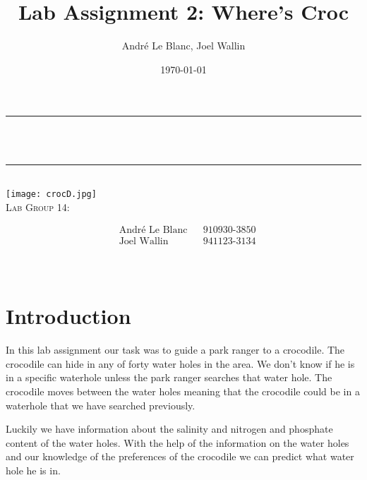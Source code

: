\documentclass[12pt, a4paper]{article}
\title{Lab Assignment 2: Where’s Croc}	%
\author{André Le Blanc, Joel Wallin}
\date{\today}
\makeatletter
\let\thetitle\@title
\makeatother
\begin{document}
\begin{titlepage}
	\centering
    \vspace*{0.5 cm}
	\rule{\linewidth}{0.2 mm} \\[0.4 cm]
	{ \huge \bfseries \thetitle}\\  
	\rule{\linewidth}{0.2 mm} \\[1.5 cm]
    \texttt{[image: crocD.jpg]}\\[0.5 cm]
    
    \textsc{\Large Lab Group 14:}\\[0.5 cm]
	\begin{minipage}{0.4\textwidth}  
    \begin{align*}
	&\text{André Le Blanc}    &&\text{910930-3850}\\
	&\text{Joel Wallin}  &&\text{941123-3134}\\
	\end{align*}
	\end{minipage}\\[2 cm]
\end{titlepage}


\newpage
\tableofcontents
\newpage

\section{Introduction}

In this lab assignment our task was to guide a park ranger to a crocodile. The crocodile can hide in any of forty water holes in the area. We don't know if he is in a specific waterhole unless the park ranger searches that water hole. The crocodile moves between the water holes meaning that the crocodile could be in a waterhole that we have searched previously. 

Luckily we have information about the salinity and  nitrogen and phosphate content of the water holes. With the help of the information on the water holes and our knowledge of the preferences of the crocodile we can predict what water hole he is in. 
\end{document}
